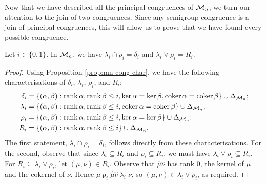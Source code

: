 Now that we have described all the principal congruences of $\mathcal{M}_n$, we turn
our attention to the join of two congruences.  Since any semigroup congruence is
a join of principal congruences, this will allow us to prove that we have found
every possible congruence.

\begin{lemma}
  \label{lem:mn-lattice-intra}
  Let $i \in \{0, 1\}$.  In $\mathcal{M}_n$, we have $\lambda_i \cap \rho_i = \delta_i$
  and $\lambda_i \vee \rho_i = R_i$.
  \begin{proof}
    Using Proposition \ref{prop:mn-cong-char}, we have the following
    characterisations of $\delta_i$, $\lambda_i$, $\rho_i$, and $R_i$:
    \begin{align*}
      \delta_i &= \{(\alpha,\beta) :
                    \operatorname{rank}\alpha,\operatorname{rank}\beta \leq i,
                    \ker\alpha = \ker\beta,
                    \operatorname{coker}\alpha = \operatorname{coker}\beta\} \cup \Delta_{\mathcal{M}_n}; \\
      \lambda_i &= \{(\alpha,\beta) :
                     \operatorname{rank}\alpha,\operatorname{rank}\beta \leq i,
                     \operatorname{coker}\alpha = \operatorname{coker}\beta\} \cup \Delta_{\mathcal{M}_n}; \\
      \rho_i &= \{(\alpha,\beta) :
                  \operatorname{rank}\alpha,\operatorname{rank}\beta \leq i,
                  \ker\alpha = \ker\beta\} \cup \Delta_{\mathcal{M}_n}; \\
      R_i &= \{(\alpha,\beta) :
               \operatorname{rank}\alpha,\operatorname{rank}\beta \leq i\} \cup \Delta_{\mathcal{M}_n}.
    \end{align*}
    The first statement, $\lambda_i \cap \rho_i = \delta_i$, follows directly
    from these characterisations.  For the second, observe that since
    $\lambda_i \subseteq R_i$ and $\rho_i \subseteq R_i$, we must have
    $\lambda_i \vee \rho_i \subseteq R_i$.  For
    $R_i \subseteq \lambda_i \vee \rho_i$, let $(\mu,\nu) \in R_i$.  Observe
    that $\widehat\mu\widehat\nu$ has rank $0$, the kernel of $\mu$ and the
    cokernel of $\nu$.  Hence
    $\mu \mathrel\rho_i \widehat\mu\widehat\nu \mathrel\lambda_i \nu$, so
    $(\mu, \nu) \in \lambda_i \vee \rho_i$, as required.
  \end{proof}
\end{lemma}

